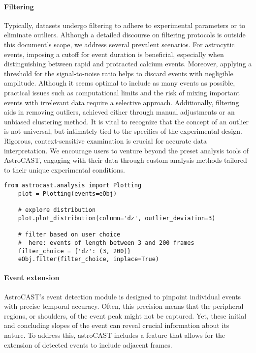 \paragraph{Filtering}
Typically, datasets undergo filtering to adhere to experimental parameters or to eliminate outliers. Although a detailed discourse on filtering protocols is outside this document's scope, we address several prevalent scenarios. For astrocytic events, imposing a cutoff for event duration is beneficial, especially when distinguishing between rapid and protracted calcium events. Moreover, applying a threshold for the signal-to-noise ratio helps to discard events with negligible amplitude. Although it seems optimal to include as many events as possible, practical issues such as computational limits and the risk of mixing important events with irrelevant data require a selective approach. Additionally, filtering aids in removing outliers, achieved either through manual adjustments or an unbiased clustering method. It is vital to recognize that the concept of an outlier is not universal, but intimately tied to the specifics of the experimental design. Rigorous, context-sensitive examination is crucial for accurate data interpretation. We encourage users to venture beyond the preset analysis tools of AstroCAST, engaging with their data through custom analysis methods tailored to their unique experimental conditions.

\begin{lstlisting}[style=pyStyle]
    from astrocast.analysis import Plotting
    plot = Plotting(events=eObj)

    # explore distribution
    plot.plot_distribution(column='dz', outlier_deviation=3)

    # filter based on user choice
    #  here: events of length between 3 and 200 frames
    filter_choice = {'dz': (3, 200)}
    eObj.filter(filter_choice, inplace=True)
\end{lstlisting}

\paragraph{Event extension}
AstroCAST's event detection module is designed to pinpoint individual events with precise temporal accuracy. Often, this precision means that the peripheral regions, or shoulders, of the event peak might not be captured. Yet, these initial and concluding slopes of the event can reveal crucial information about its nature. To address this, astroCAST includes a feature that allows for the extension of detected events to include adjacent frames.

